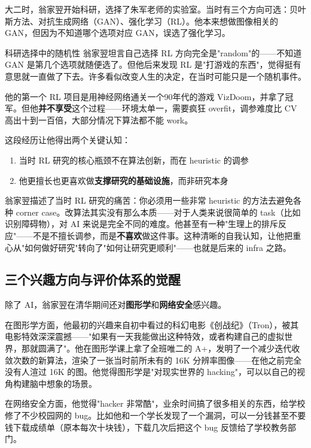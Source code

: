 \documentclass[a4paper]{article}
\begin{document}
大二时，翁家翌开始科研，选择了朱军老师的实验室。当时有三个方向可选：贝叶斯方法、对抗生成网络（GAN）、强化学习（RL）。他本来想做图像相关的 GAN，但因为不知道哪个选项对应 GAN，误选了强化学习。

\begin{warningbox}{科研选择中的随机性}
翁家翌坦言自己选择 RL 方向完全是"random"的——不知道 GAN 是第几个选项就随便选了。但他后来发现 RL 是"打游戏的东西"，觉得挺有意思就一直做了下去。许多看似改变人生的决定，在当时可能只是一个随机事件。
\end{warningbox}

他的第一个 RL 项目是用神经网络通关一个90年代的游戏 VizDoom，并拿了冠军。但他\textbf{并不享受}这个过程——环境太单一，需要疯狂 overfit，调参难度比 CV 高出十到一百倍，大部分情况下算法都不能 work。

这段经历让他得出两个关键认知：
\begin{enumerate}
    \item 当时 RL 研究的核心瓶颈不在算法创新，而在 heuristic 的调参
    \item 他更擅长也更喜欢做\textbf{支撑研究的基础设施}，而非研究本身
\end{enumerate}

翁家翌描述了当时 RL 研究的痛苦：你必须用一些非常 heuristic 的方法去避免各种 corner case。改算法其实没有那么本质——对于人类来说很简单的 task（比如识别障碍物），对 AI 来说是完全不同的难度。他甚至有一种"生理上的排斥反应"——不是不擅长调参，而是\textbf{不喜欢}做这件事。这种清晰的自我认知，让他把重心从"如何做好研究"转向了"如何让研究更顺利"——也就是后来的 infra 之路。

\subsection{三个兴趣方向与评价体系的觉醒}

除了 AI，翁家翌在清华期间还对\textbf{图形学}和\textbf{网络安全}感兴趣。

在图形学方面，他最初的兴趣来自初中看过的科幻电影《创战纪》（Tron），被其电影特效深深震撼——"如果有一天我能做出这种特效，或者构建自己的虚拟世界，那就圆满了"。他在图形学课上拿了全班唯二的 A+，发明了一个减少迭代收敛次数的新算法，渲染了一张当时前所未有的 16K 分辨率图像——在他之前完全没有人渲过 16K 的图。他觉得图形学是"对现实世界的 hacking"，可以以自己的视角构建脑中想象的场景。

在网络安全方面，他觉得"hacker 非常酷"，业余时间搞了很多相关的东西，给学校修了不少校园网的 bug。比如他和一个学长发现了一个漏洞，可以一分钱甚至不要钱下载成绩单（原本每次十块钱），下载几次后把这个 bug 反馈给了学校教务部门。
\end{document}
